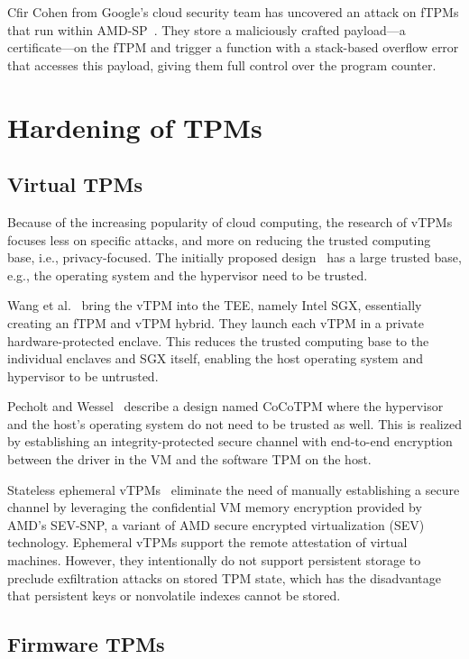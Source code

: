 Cfir Cohen from Google's cloud security team has uncovered an attack on fTPMs that run within AMD-SP~\cite{cohen}.
They store a maliciously crafted payload---a certificate---on the fTPM and trigger a function with a stack-based overflow error that accesses this payload, giving them full control over the program counter.

\section{Hardening of TPMs}

\subsection{Virtual TPMs}

Because of the increasing popularity of cloud computing, the research of vTPMs focuses less on specific attacks, and more on reducing the trusted computing base, i.e., privacy-focused.
The initially proposed design~\cite{268868} has a large trusted base, e.g., the operating system and the hypervisor need to be trusted.

Wang et al.~\cite{Wang2019} bring the vTPM into the \ac{TEE}, namely Intel SGX, essentially creating an fTPM and vTPM hybrid.
They launch each vTPM in a private hardware-protected enclave.
This reduces the trusted computing base to the individual enclaves and SGX itself, enabling the host operating system and hypervisor to be untrusted.

Pecholt and Wessel~\cite{Pecholt2022} describe a design named CoCoTPM where the hypervisor and the host's operating system do not need to be trusted as well.
This is realized by establishing an integrity-protected secure channel with end-to-end encryption between the driver in the VM and the software TPM on the host.

Stateless ephemeral vTPMs~\cite{Narayanan2023} eliminate the need of manually establishing a secure channel by leveraging the confidential VM memory encryption provided by AMD's SEV-SNP, a variant of AMD secure encrypted virtualization (SEV) technology.
Ephemeral vTPMs support the remote attestation of virtual machines.
However, they intentionally do not support persistent storage to preclude exfiltration attacks on stored TPM state, which has the disadvantage that persistent keys or nonvolatile indexes cannot be stored.

\subsection{Firmware TPMs}

